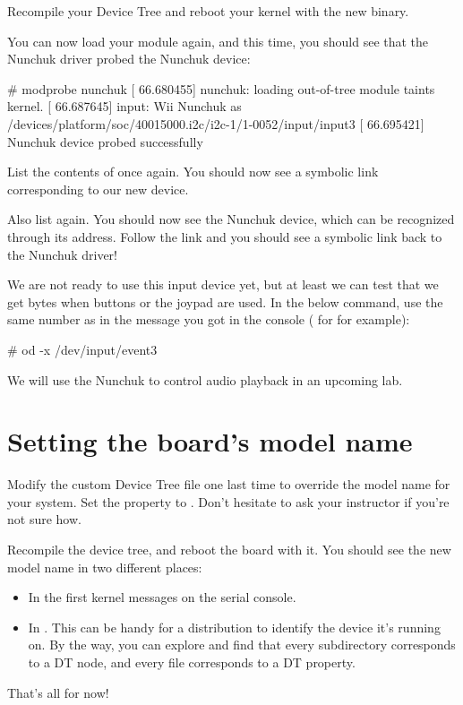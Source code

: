 Recompile your Device Tree and reboot your kernel with the new binary.

You can now load your module again, and this time, you should see that
the Nunchuk driver probed the Nunchuk device:

\begin{bashinput}
# modprobe nunchuk
[   66.680455] nunchuk: loading out-of-tree module taints kernel.
[   66.687645] input: Wii Nunchuk as /devices/platform/soc/40015000.i2c/i2c-1/1-0052/input/input3
[   66.695421] Nunchuk device probed successfully
\end{bashinput}

List the contents of  once again. You
should now see a symbolic link corresponding to our new device.

Also list  again. You should now see the
Nunchuk device, which can be recognized through its  address.
Follow the link and you should see a symbolic link back to the Nunchuk
driver!

We are not ready to use this input device yet, but at least we can test
that we get bytes when buttons or the joypad are used. In the below
command, use the same number as in the message you got in the console
( for  for example):

\begin{bashinput}
# od -x /dev/input/event3
\end{bashinput}

We will use the Nunchuk to control audio playback in an upcoming lab.

\section{Setting the board's model name}

Modify the custom Device Tree file one last time to override the model
name for your system. Set the  property to
. Don't hesitate to ask your
instructor if you're not sure how.

Recompile the device tree, and reboot the board with it. You should see
the new model name in two different places:

\begin{itemize}
\item In the first kernel messages on the serial console.
\item In . This can be
      handy for a distribution to identify the device it's running on.
      By the way, you can explore  and
      find that every subdirectory corresponds to a DT node, and every
      file corresponds to a DT property.
\end{itemize}

That's all for now!
